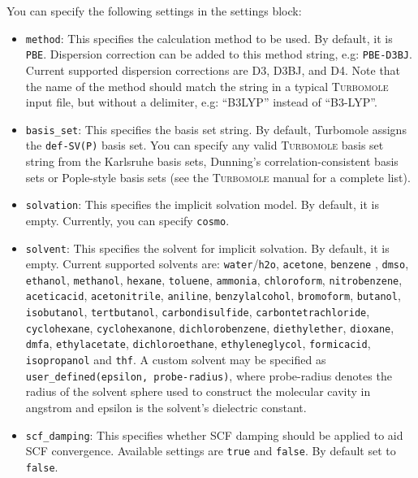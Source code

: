 \documentclass[]{tufte-book}
\begin{document}
You can specify the following settings in the settings block:
\begin{itemize}
\item \texttt{method}:
This specifies the calculation method to be used. By default, it is \texttt{PBE}. Dispersion correction can be added to this method string, e.g: \texttt{PBE-D3BJ}. Current supported dispersion corrections are D3\cite{grimmeD3}, D3BJ\cite{bjDamping}, and D4\cite{d4Damping}.
Note that the name of the method should match the string in a typical \textsc{Turbomole} input file, but without a delimiter, e.g: ``B3LYP'' instead of ``B3-LYP''.
\item \texttt{basis\_set}: This specifies the basis set string. By default, Turbomole assigns the \texttt{def-SV(P)} basis set. You can specify any valid \textsc{Turbomole} basis set string from the Karlsruhe basis sets\cite{karlsruheBasisSets}, Dunning's correlation-consistent basis sets\cite{dunningBasisSets} or Pople-style basis sets\cite{popleBasisSets} (see the \textsc{Turbomole} manual for a complete list).
\item \texttt{solvation}: This specifies the implicit solvation model. By default, it is empty. Currently, you can specify \texttt{cosmo}.
\item \texttt{solvent}: This specifies the solvent for implicit solvation. By default, it is empty. Current supported solvents are: \texttt{water}/\texttt{h2o}, \texttt{acetone}, \texttt{benzene}
, \texttt{dmso}, \texttt{ethanol}, \texttt{methanol}, \texttt{hexane}, \texttt{toluene}, \texttt{ammonia}, \texttt{chloroform}, \texttt{nitrobenzene}, \texttt{aceticacid}, \texttt{acetonitrile}, \texttt{aniline}, \texttt{benzylalcohol}, \texttt{bromoform}, \texttt{butanol}, \texttt{isobutanol}, \texttt{tertbutanol}, \texttt{carbondisulfide}, \texttt{carbontetrachloride}, \texttt{cyclohexane}, \texttt{cyclohexanone}, \texttt{dichlorobenzene}, \texttt{diethylether}, \texttt{dioxane}, \texttt{dmfa}, \texttt{ethylacetate}, \texttt{dichloroethane}, \texttt{ethyleneglycol}, \texttt{formicacid}, \texttt{isopropanol} and \texttt{thf}. A custom solvent may be specified as \texttt{user\_defined(epsilon, probe-radius)}, where probe-radius denotes the radius of the solvent sphere used to construct the molecular cavity in angstrom and epsilon is the solvent's dielectric constant.
\item \texttt{scf\_damping}: This specifies whether SCF damping should be applied to aid SCF convergence. Available settings are \texttt{true} and \texttt{false}. By default set to \texttt{false}.

\end{itemize}
\end{document}
